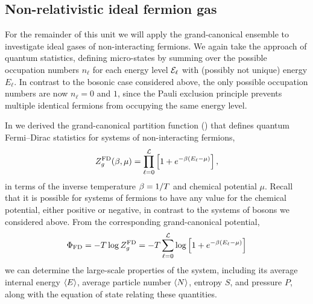 \newpage %
\subsection{\label{sec:fermi_nonrel}Non-relativistic ideal fermion gas}
For the remainder of this unit we will apply the grand-canonical ensemble to investigate ideal gases of non-interacting fermions.
We again take the approach of quantum statistics, defining micro-states by summing over the possible occupation numbers $n_{\ell}$ for each energy level $\mathcal E_{\ell}$ with (possibly not unique) energy $E_{\ell}$.
In contrast to the bosonic case considered above, the only possible occupation numbers are now $n_{\ell} = 0$ and $1$, since the Pauli exclusion principle prevents multiple identical fermions from occupying the same energy level.

In  we derived the grand-canonical partition function () that defines quantum Fermi--Dirac statistics for systems of non-interacting fermions,
\begin{equation*}
  Z_g^{\text{FD}}(\beta, \mu) = \prod_{\ell = 0}^{\mathcal L} \left[1 + e^{-\beta (E_{\ell} - \mu)}\right],
\end{equation*}
in terms of the inverse temperature $\beta = 1 / T$ and chemical potential $\mu$.
Recall that it is possible for systems of fermions to have any value for the chemical potential, either positive or negative, in contrast to the systems of bosons we considered above.
From the corresponding grand-canonical potential,
\begin{equation*}
  \Phi_{\text{FD}} = -T\log Z_g^{\text{FD}} = -T \sum_{\ell = 0}^{\mathcal L} \log\left[1 + e^{-\beta (E_{\ell} - \mu)}\right]
\end{equation*}
we can determine the large-scale properties of the system, including its average internal energy $\left\langle E \right\rangle$, average particle number $\left\langle N \right\rangle$, entropy $S$, and pressure $P$, along with the equation of state relating these quantities.

